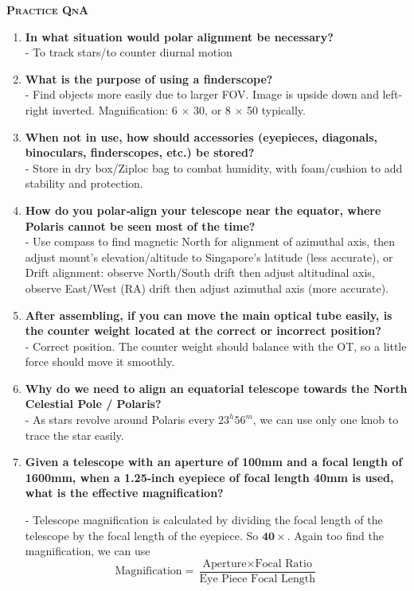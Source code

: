\documentclass[a4paper,12pt]{extarticle}
\begin{document}
\textsc{\textbf{Practice QnA}}
\begin{enumerate}
	\item \textbf{In what situation would polar alignment be necessary?}\\
	- To track stars/to counter diurnal motion
	\item\textbf{ What is the purpose of using a finderscope?}\\
	- Find objects more easily due to larger FOV. Image is upside down and left-right inverted.
	Magnification: 6 $\times$ 30, or 8 $\times$ 50 typically.
	\item \textbf{When not in use, how should accessories (eyepieces, diagonals, binoculars, finderscopes, etc.) be stored?}\\
	- Store in dry box/Ziploc bag to combat humidity, with foam/cushion to add stability and protection.
	\item \textbf{How do you polar‐align your telescope near the equator, where Polaris cannot be seen most
		of the time?}\\
	
	- Use compass to find magnetic North for alignment of azimuthal axis, then adjust mount's elevation/altitude to Singapore’s latitude  (less accurate), or\\
	
	Drift alignment: observe North/South drift then adjust altitudinal axis, observe East/West (RA) drift then adjust azimuthal axis (more accurate).
	\item  \textbf{After assembling, if you can move the main optical tube easily, is the counter weight located at the correct or incorrect position? }\\
	
	- Correct position. The counter weight should balance with the OT, so a little force should move it smoothly. 
	\item \textbf{Why do we need to align an equatorial telescope towards the North Celestial Pole / Polaris?}\\
	- As stars revolve around Polaris every $23^h56^m$, we can use only one knob to trace the star easily.
	
	\item \textbf{Given a telescope with an aperture of 100mm and a focal length of 1600mm, when a 1.25-inch eyepiece
	of focal length 40mm is used, what is the effective magnification?}

- Telescope magnification is calculated by dividing the focal length of the telescope by the focal
length of the eyepiece. So $\mathbf{40\times}$. Again too find the magnification, we can use
$$\text{Magnification}=\frac{\text{Aperture}\times \text{Focal Ratio}}{\text{Eye Piece Focal Length}}$$


\end{enumerate}
\end{document}
